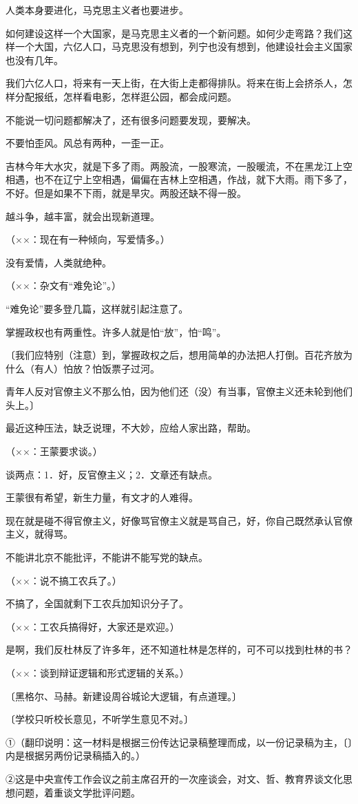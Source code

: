 人类本身要进化，马克思主义者也要进步。

如何建设这样一个大国家，是马克思主义者的一个新问题。如何少走弯路？我们这样一个大国，六亿人口，马克思没有想到，列宁也没有想到，他建设社会主义国家也没有几年。

我们六亿人口，将来有一天上街，在大街上走都得排队。将来在街上会挤杀人，怎样分配报纸，怎样看电影，怎样逛公园，都会成问题。

不能说一切问题都解决了，还有很多问题要发现，要解决。

不要怕歪风。风总有两种，一歪一正。

吉林今年大水灾，就是下多了雨。两股流，一股寒流，一股暖流，不在黑龙江上空相遇，也不在辽宁上空相遇，偏偏在吉林上空相遇，作战，就下大雨。雨下多了，不好。但是如果不下雨，就是旱灾。两股还缺不得一股。

越斗争，越丰富，就会出现新道理。

（××：现在有一种倾向，写爱情多。）

没有爱情，人类就绝种。

（××：杂文有“难免论”。）

“难免论”要多登几篇，这样就引起注意了。

掌握政权也有两重性。许多人就是怕“放”，怕“鸣”。

〔我们应特别（注意）到，掌握政权之后，想用简单的办法把人打倒。百花齐放为什么（有人）怕放？怕饭票子过河。

青年人反对官僚主义不那么怕，因为他们还（没）有当事，官僚主义还未轮到他们头上。〕

最近这种压法，缺乏说理，不大妙，应给人家出路，帮助。

（××：王蒙要求谈。）

谈两点：1．好，反官僚主义；2．文章还有缺点。

王蒙很有希望，新生力量，有文才的人难得。

现在就是碰不得官僚主义，好像骂官僚主义就是骂自己，好，你自己既然承认官僚主义，就得骂。

不能讲北京不能批评，不能讲不能写党的缺点。

（××：说不搞工农兵了。）

不搞了，全国就剩下工农兵加知识分子了。

（××：工农兵搞得好，大家还是欢迎。）

是啊，我们反杜林反了许多年，还不知道杜林是怎样的，可不可以找到杜林的书？

（××：谈到辩证逻辑和形式逻辑的关系。）

〔黑格尔、马赫。新建设周谷城论大逻辑，有点道理。〕

〔学校只听校长意见，不听学生意见不对。〕

①（翻印说明：这一材料是根据三份传达记录稿整理而成，以一份记录稿为主，〔〕内是根据另两份记录稿插入的。）

②这是中央宣传工作会议之前主席召开的一次座谈会，对文、哲、教育界谈文化思想问题，着重谈文学批评问题。


